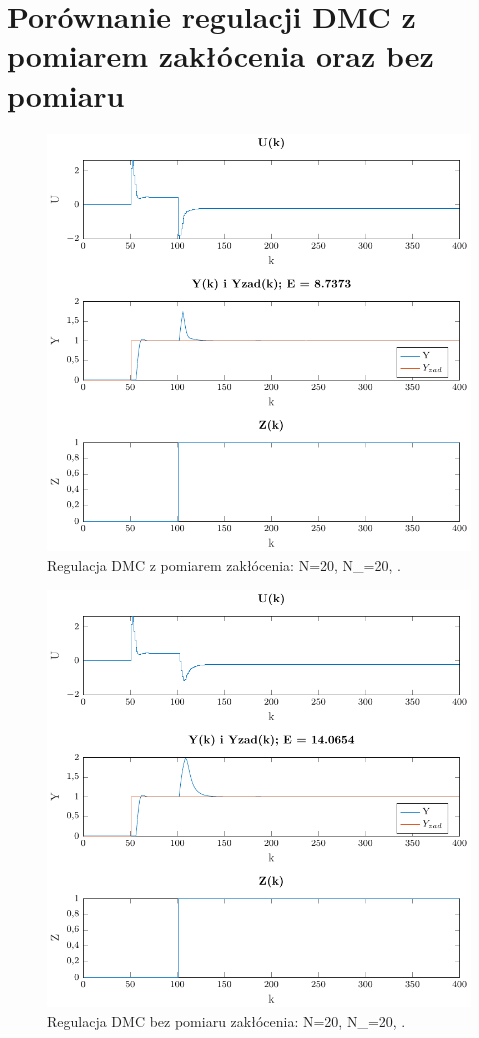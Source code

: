 \documentclass[a4paper,titlepage,11pt,twosides,floatssmall]{mwrep}
\begin{document}
\section{Porównanie regulacji DMC z pomiarem zakłócenia oraz bez pomiaru}

\begin{figure}[H]
	\centering
	\includegraphics{../../Lab2/PDF_rysunki/Z5_DMCZZakloceniami.pdf}
	\caption{Regulacja DMC z pomiarem zakłócenia: N=20, N_{}=20, .}
	\label{pom_zak}
\end{figure}

\begin{figure}[H]
	\centering
	\includegraphics{../../Lab2/PDF_rysunki/Z5_DMCZZakloceniamiBezOdsprz.pdf}
	\caption{Regulacja DMC bez pomiaru zakłócenia: N=20, N_{}=20, .}
	\label{bez_pom_zak}
\end{figure}
\end{document}
